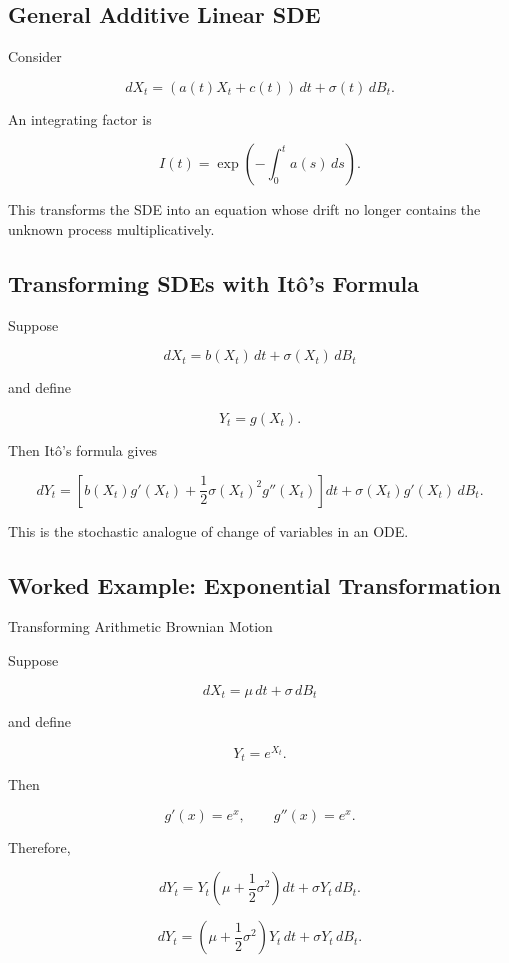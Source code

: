 \subsection{General Additive Linear SDE}
\label{subsec:general-additive-linear-sde}

Consider

\[
\boxed{
dX_t
=
(a(t)X_t+c(t))\,dt
+
\sigma(t)\,dB_t.
}
\]

An integrating factor is

\[
\boxed{
I(t)
=
\exp
\left(
-\int_0^t
a(s)\,ds
\right).
}
\]

This transforms the SDE into an equation whose drift no longer contains
the unknown process multiplicatively.

\subsection{Transforming SDEs with It\^o's Formula}
\label{subsec:transform-sdes-ito}

Suppose

\[
dX_t
=
b(X_t)\,dt
+
\sigma(X_t)\,dB_t
\]

and define

\[
Y_t=g(X_t).
\]

Then It\^o's formula gives

\[
\boxed{
dY_t
=
\left[
b(X_t)g'(X_t)
+
\frac12
\sigma(X_t)^2g''(X_t)
\right]dt
+
\sigma(X_t)g'(X_t)\,dB_t.
}
\]

This is the stochastic analogue of change of variables in an ODE.

\subsection{Worked Example: Exponential Transformation}
\label{subsec:worked-sde-exponential-transform}

\begin{workedexamplebox}{Transforming Arithmetic Brownian Motion}

Suppose

\[
dX_t
=
\mu\,dt
+
\sigma\,dB_t
\]

and define

\[
Y_t=e^{X_t}.
\]

Then

\[
g'(x)=e^x,
\qquad
g''(x)=e^x.
\]

Therefore,

\[
dY_t
=
Y_t
\left(
\mu+\frac12\sigma^2
\right)dt
+
\sigma Y_t\,dB_t.
\]

\begin{answerbox}
\[
\boxed{
dY_t
=
\left(
\mu+\frac12\sigma^2
\right)Y_t\,dt
+
\sigma Y_t\,dB_t.
}
\]
\end{answerbox}

\end{workedexamplebox}

